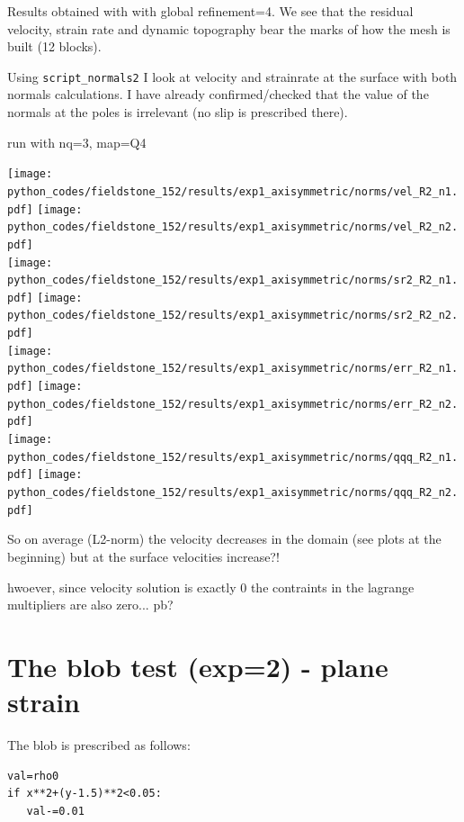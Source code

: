 \begin{center}
{\captionfont Results obtained with \aspect with global refinement=4. We see that the residual 
velocity, strain rate and dynamic topography bear the marks of how the mesh is built (12 blocks).}
\end{center}


\newpage

Using {\tt script\_normals2} I look at velocity and strainrate at the surface
with both normals calculations. 
I have already confirmed/checked that the value of the normals at the poles is irrelevant
(no slip is prescribed there).

run with nq=3, map=Q4

\begin{center}
\texttt{[image: python\_codes/fieldstone\_152/results/exp1\_axisymmetric/norms/vel\_R2\_n1.pdf]}
\texttt{[image: python\_codes/fieldstone\_152/results/exp1\_axisymmetric/norms/vel\_R2\_n2.pdf]}\\
\texttt{[image: python\_codes/fieldstone\_152/results/exp1\_axisymmetric/norms/sr2\_R2\_n1.pdf]}
\texttt{[image: python\_codes/fieldstone\_152/results/exp1\_axisymmetric/norms/sr2\_R2\_n2.pdf]}\\
\texttt{[image: python\_codes/fieldstone\_152/results/exp1\_axisymmetric/norms/err\_R2\_n1.pdf]}
\texttt{[image: python\_codes/fieldstone\_152/results/exp1\_axisymmetric/norms/err\_R2\_n2.pdf]}\\
\texttt{[image: python\_codes/fieldstone\_152/results/exp1\_axisymmetric/norms/qqq\_R2\_n1.pdf]}
\texttt{[image: python\_codes/fieldstone\_152/results/exp1\_axisymmetric/norms/qqq\_R2\_n2.pdf]}\\
\end{center}

So on average (L2-norm) the velocity decreases in the domain (see plots at the 
beginning) but at the surface velocities increase?!

hwoever, since velocity solution is exactly 0 the contraints in the lagrange multipliers are also zero... pb?

\newpage
\section*{The blob test (exp=2) - plane strain}

The blob is prescribed as follows:
\begin{lstlisting}
val=rho0
if x**2+(y-1.5)**2<0.05:
   val-=0.01
\end{lstlisting}

